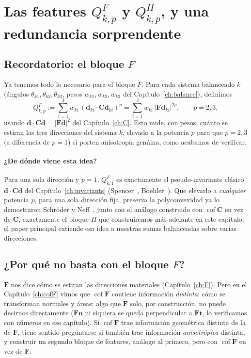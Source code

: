 \documentclass[11pt,a4paper]{article}
\newcommand{\Cof}{\operatorname{cof}}
\begin{document}
\section{Las features $Q^F_{k,p}$ y $Q^H_{k,p}$, y una redundancia sorprendente}
\label{ch:qfqh}

\subsection{Recordatorio: el bloque $F$}

Ya tenemos todo lo necesario para el bloque $F$. Para cada sistema
balanceado $k$ (\'angulos $\theta_{k1},\theta_{k2},\theta_{k3}$, pesos
$w_{k1},w_{k2},w_{k3}$ del Cap\'itulo~\ref{ch:balance}), definimos
\begin{equation}
 Q_{k,p}^F:=\sum_{i=1}^3 w_{ki}\,(\bm d_{ki}\cdot\bm C\bm d_{ki})^p
 =\sum_{i=1}^3 w_{ki}\,|\bm F\bm d_{ki}|^{2p},
 \qquad p=2,3,
 \label{eq:appB-QF-def}
\end{equation}
usando $\bm d\cdot\bm C\bm d=|\bm F\bm d|^2$ del
Cap\'itulo~\ref{ch:C}. Esto mide, con pesos, cu\'anto se estiran las
tres direcciones del sistema $k$, elevado a la potencia $p$ para
que $p=2,3$ (a diferencia de $p=1$) s\'i porten anisotrop\'ia
gen\'uina, como acabamos de verificar.

\paragraph{¿De d\'onde viene esta idea?} Para una sola direcci\'on y
$p=1$, $Q_{k,1}^F$ es exactamente el pseudo-invariante cl\'asico
$\bm d\cdot\bm C\bm d$ del Cap\'itulo~\ref{ch:invariants}
(Spencer~\cite{Spencer1971,Spencer1984}, Boehler~\cite{Boehler1987}). Que
elevarlo a \emph{cualquier} potencia $p$, para una sola direcci\'on fija,
preserva la polyconvexidad ya lo demostraron Schr\"oder y
Neff~\cite{SchroderNeff2003}, junto con el an\'alogo construido con
$\Cof\bm C$ en vez de $\bm C$, exactamente el bloque $H$ que
construiremos m\'as adelante en este cap\'itulo; el paper principal
extiende esa idea a nuestras sumas balanceadas sobre varias direcciones.

\subsection{¿Por qu\'e no basta con el bloque $F$?}

$\bm F$ nos dice c\'omo se estiran las direcciones materiales
(Cap\'itulo~\ref{ch:F}). Pero en el Cap\'itulo~\ref{ch:cofF} vimos que
$\Cof\bm F$ contiene informaci\'on \emph{distinta}: c\'omo se
transforman normales y \'areas: algo que $\bm F$ solo, por
construcci\'on, no puede decirnos directamente ($\bm F\bm n$ ni
siquiera se queda perpendicular a $\bm F\bm t$, lo verificamos con
n\'umeros en ese cap\'itulo). Si $\Cof\bm F$ trae informaci\'on
geom\'etrica distinta de la de $\bm F$, tiene sentido preguntarse si
tambi\'en trae informaci\'on \emph{anisotr\'opica} distinta, y
construir un segundo bloque de features, an\'alogo al primero, pero
con $\Cof\bm F$ en vez de $\bm F$.
\end{document}
